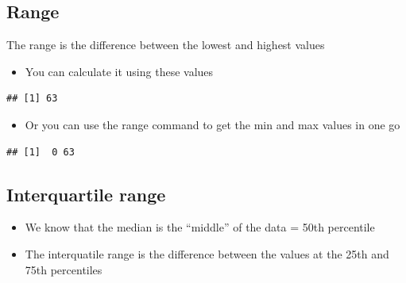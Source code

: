 \documentclass[
]{book}
\newenvironment{Shaded}{\begin{snugshade}}{\end{snugshade}}
\newcommand{\KeywordTok}[1]{\textcolor[rgb]{0.13,0.29,0.53}{\textbf{#1}}}
\newcommand{\NormalTok}[1]{#1}
\newcommand{\OperatorTok}[1]{\textcolor[rgb]{0.81,0.36,0.00}{\textbf{#1}}}
\newcommand{\StringTok}[1]{\textcolor[rgb]{0.31,0.60,0.02}{#1}}
\providecommand{\tightlist}{%
  \setlength{\itemsep}{0pt}\setlength{\parskip}{0pt}}
\begin{document}
\hypertarget{range}{%
\subsection{Range}\label{range}}

The range is the difference between the lowest and highest values

\begin{itemize}
\tightlist
\item
  You can calculate it using these values
\end{itemize}

\begin{Shaded}
\end{Shaded}

\begin{verbatim}
## [1] 63
\end{verbatim}

\begin{itemize}
\tightlist
\item
  Or you can use the range command to get the min and max values in one go
\end{itemize}

\begin{Shaded}
\end{Shaded}

\begin{verbatim}
## [1]  0 63
\end{verbatim}

\hypertarget{interquartile-range}{%
\subsection{Interquartile range}\label{interquartile-range}}

\begin{itemize}
\tightlist
\item
  We know that the median is the ``middle'' of the data = 50th percentile
\item
  The interquatile range is the difference between the values at the 25th and 75th percentiles
\end{itemize}
\end{document}
